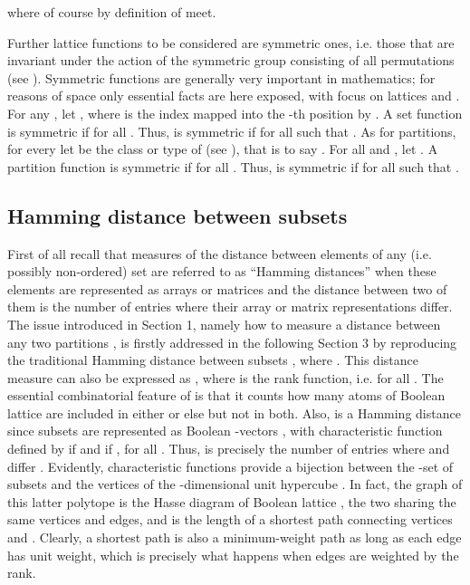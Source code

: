 \documentclass[a4paper,10pt]{article}
\begin{document}
where of course  by definition of meet.

Further lattice functions to be considered are symmetric ones, i.e. those that are invariant under the action of the symmetric group  consisting of all 
permutations  (see \cite[p. 161]{Aigner79}). Symmetric functions are generally very important in mathematics; for reasons of space only essential facts are here
exposed, with focus on lattices  and . For any , let , where 
is the index mapped into the -th position by . A set function  is symmetric if  for all . Thus, 
is symmetric if  for all  such that . As for partitions, for every  let  be the class or
type of  (see \cite{RotaMobius}), that is to say . For all  and , let
. A partition function  is symmetric if  for all .
Thus,  is symmetric if  for all  such that .

\subsection{Hamming distance between subsets}
First of all recall that measures of the distance between elements of any (i.e. possibly non-ordered) set are referred to as ``Hamming distances'' when these elements are represented
as arrays or matrices and the distance between two of them is the number of entries where their array or matrix representations differ. The issue introduced in Section 1, namely how to
measure a distance  between any two partitions , is firstly addressed in the following Section 3 by reproducing the traditional Hamming distance 
between subsets , where . This distance measure can also be expressed as ,
where  is the rank function, i.e.  for all . The essential combinatorial feature of  is that it counts how many atoms
 of Boolean lattice  are included in either  or else  but not in both. Also,  is a Hamming distance since subsets 
are represented as Boolean -vectors , with characteristic function  defined by  if  and  if
, for all . Thus,  is precisely the number of entries where  and  differ
\cite{Aigner79,Bollobas86}. Evidently, characteristic functions  provide a bijection between the -set of subsets  and the vertices  of
the -dimensional unit hypercube . In fact, the graph of this latter polytope \cite{BronstedConvex,Branko2001} is the Hasse diagram of Boolean lattice , the
two sharing the same vertices and edges, and  is the length of a shortest path connecting vertices  and . Clearly, a shortest path is also a minimum-weight
path as long as each edge has unit weight, which is precisely what happens when edges are weighted by the rank.
\end{document}
